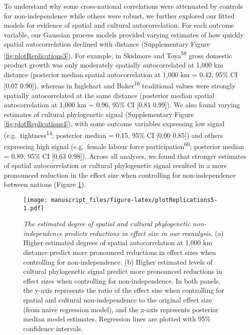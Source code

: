 \documentclass[
  man,floatsintext]{apa6}
\begin{document}
To understand why some cross-national correlations were attenuated by controls for non-independence while others were robust, we further explored our fitted models for evidence of spatial and cultural autocorrelation. For each outcome variable, our Gaussian process models provided varying estimates of how quickly spatial autocorrelation declined with distance (Supplementary Figure \ref{fig:plotReplications3}). For example, in Skidmore and Toya\textsuperscript{58} gross domestic product growth was only moderately spatially autocorrelated at 1,000 km distance (posterior median spatial autocorrelation at 1,000 km = 0.42, 95\% CI {[}0.07 0.90{]}), whereas in Inglehart and Baker\textsuperscript{16} traditional values were strongly spatially autocorrelated at the same distance (posterior median spatial autocorrelation at 1,000 km = 0.96, 95\% CI {[}0.81 0.99{]}). We also found varying estimates of cultural phylogenetic signal (Supplementary Figure \ref{fig:plotReplications4}), with some outcome variables expressing low signal (e.g.~tightness\textsuperscript{14}; posterior median = 0.15, 95\% CI {[}0.00 0.85{]}) and others expressing high signal (e.g.~female labour force participation\textsuperscript{60}; posterior median = 0.89, 95\% CI {[}0.63 0.98{]}). Across all analyses, we found that stronger estimates of spatial autocorrelation or cultural phylogenetic signal resulted in a more pronounced reduction in the effect size when controlling for non-independence between nations (Figure \ref{fig:plotReplications5}).



\begin{figure}
\centering
\texttt{[image: manuscript\_files/figure-latex/plotReplications5-1.pdf]}
\caption{\label{fig:plotReplications5}\emph{The estimated degree of spatial and cultural phylogenetic non-independence predicts reductions in effect size in our reanalysis.} (a) Higher estimated degrees of spatial autocorrelation at 1,000 km distance predict more pronounced reductions in effect sizes when controlling for non-independence. (b) Higher estimated levels of cultural phylogenetic signal predict more pronounced reductions in effect sizes when controlling for non-independence. In both panels, the y-axis represents the ratio of the effect size when controlling for spatial and cultural non-independence to the original effect size (from naive regression model), and the x-axis represents posterior median model estimates. Regression lines are plotted with 95\% confidence intervals.}
\end{figure}
\end{document}
